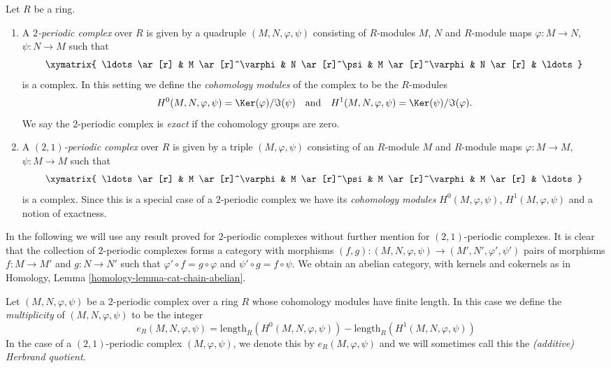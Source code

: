 \begin{definition}
\label{definition-periodic-complex}
Let $R$ be a ring.
\begin{enumerate}
\item A {\it $2$-periodic complex} over $R$ is given
by a quadruple $(M, N, \varphi, \psi)$ consisting of
$R$-modules $M$, $N$ and $R$-module maps $\varphi : M \to N$,
$\psi : N \to M$ such that
$$
\xymatrix{
\ldots \ar[r] &
M \ar[r]^\varphi &
N \ar[r]^\psi &
M \ar[r]^\varphi &
N \ar[r] & \ldots
}
$$
is a complex. In this setting we define the {\it cohomology modules}
of the complex to be the $R$-modules
$$
H^0(M, N, \varphi, \psi) = \Ker(\varphi)/\Im(\psi)
\quad\text{and}\quad
H^1(M, N, \varphi, \psi) = \Ker(\psi)/\Im(\varphi).
$$
We say the $2$-periodic complex is {\it exact} if the cohomology
groups are zero.
\item A {\it $(2, 1)$-periodic complex} over $R$ is given
by a triple $(M, \varphi, \psi)$ consisting of an $R$-module $M$ and
$R$-module maps $\varphi : M \to M$, $\psi : M \to M$
such that
$$
\xymatrix{
\ldots \ar[r] &
M \ar[r]^\varphi &
M \ar[r]^\psi &
M \ar[r]^\varphi &
M \ar[r] & \ldots
}
$$
is a complex. Since this is a special case of a $2$-periodic complex
we have its {\it cohomology modules} $H^0(M, \varphi, \psi)$,
$H^1(M, \varphi, \psi)$ and a notion of exactness.
\end{enumerate}
\end{definition}

\noindent
In the following we will use any result proved for $2$-periodic
complexes without further mention for $(2, 1)$-periodic complexes.
It is clear that the collection of $2$-periodic complexes forms a
category with morphisms
$(f, g) : (M, N, \varphi, \psi) \to (M', N', \varphi', \psi')$
pairs of morphisms $f : M \to M'$ and $g : N \to N'$ such
that $\varphi' \circ f = g \circ \varphi$ and $\psi' \circ g = f \circ \psi$.
We obtain an abelian category, with kernels and cokernels as in
Homology, Lemma \ref{homology-lemma-cat-chain-abelian}.

\begin{definition}
\label{definition-periodic-length}
Let $(M, N, \varphi, \psi)$ be a $2$-periodic complex
over a ring $R$ whose cohomology modules have finite length.
In this case we define the {\it multiplicity} of $(M, N, \varphi, \psi)$
to be the integer
$$
e_R(M, N, \varphi, \psi) =
\text{length}_R(H^0(M, N, \varphi, \psi))
-
\text{length}_R(H^1(M, N, \varphi, \psi))
$$
In the case of a $(2, 1)$-periodic complex $(M, \varphi, \psi)$,
we denote this by $e_R(M, \varphi, \psi)$ and we will sometimes call this
the {\it (additive) Herbrand quotient}.
\end{definition}

